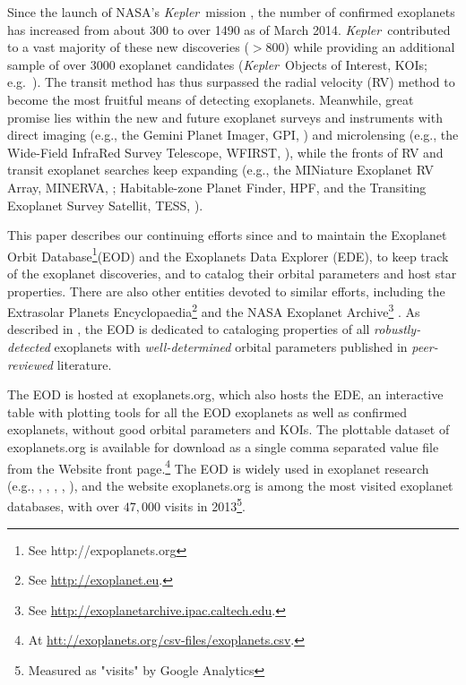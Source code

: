 \documentclass[11pt,preprint]{aastex}
\def\kepler{\textit{Kepler}}
\begin{document}
\begin{CJK*}{UTF8}{gbsn}
Since the launch of NASA's \kepler\ mission \citep{Borucki2010}, the
number of confirmed exoplanets has increased from about 300 to over
1490 as of March 2014. \kepler\ contributed to a vast
majority of these new discoveries ($> 800$) while providing an
additional sample of over 3000 exoplanet candidates (\kepler\ Objects
of Interest, KOIs; e.g.~\citealt{Batalha2013}). The transit method has thus surpassed the radial velocity (RV) method to become the most fruitful
means of detecting exoplanets. Meanwhile, great promise lies within
the new and future exoplanet surveys and instruments with direct
imaging (e.g., the Gemini Planet Imager, GPI,
\citealt{Macintosh2014}) and microlensing (e.g., the Wide-Field
InfraRed Survey Telescope, WFIRST, \citealt{Green2012}), while the
fronts of RV and transit exoplanet searches keep expanding (e.g., the
MINiature Exoplanet RV Array, MINERVA, \citealt{Wright2014}; Habitable-zone Planet Finder, HPF, \cite{Mahadevan2012} and the
Transiting Exoplanet Survey Satellit, TESS, \citealt{Ricker2010}).

This paper describes our continuing efforts since \cite{Butler2006}
and \cite{Wright2011} to maintain the Exoplanet Orbit Database\footnote{See http://expoplanets.org}(EOD)
and the Exoplanets Data Explorer (EDE), to keep track of the exoplanet
discoveries, and to catalog their orbital parameters and host star
properties. There are also other entities devoted to similar efforts,
including the Extrasolar Planets Encyclopaedia\footnote{See
  \url{http://exoplanet.eu}.}  \citep{Schneider2011} and the NASA
Exoplanet Archive\footnote{See
  \url{http://exoplanetarchive.ipac.caltech.edu}.}
\citep{Akeson2013}. As described in \cite{Wright2011}, the EOD is
dedicated to cataloging properties of all \emph{robustly-detected} exoplanets with
\emph{well-determined} orbital parameters published in
\emph{peer-reviewed} literature.

The EOD is hosted at exoplanets.org, which also hosts the EDE, an
interactive table with plotting tools for all the EOD exoplanets
as well as confirmed exoplanets, without good orbital parameters and KOIs. The plottable
dataset of exoplanets.org is available for download as a single comma separated value file from the Website front page.\footnote{At
  \url{htt://exoplanets.org/csv-files/exoplanets.csv}.} The EOD is widely
used in exoplanet research (e.g., \citealt{Dawson2013},
\citealt{Howard2013}, \citealt{Kipping2013}, \citealt{Kane2014},
\citealt{Weiss2014}), and the website exoplanets.org is among the most
visited exoplanet databases, with over $47,000$ visits in 2013\footnote{Measured as "visits" by Google Analytics}.


\end{CJK*}
\end{document}

